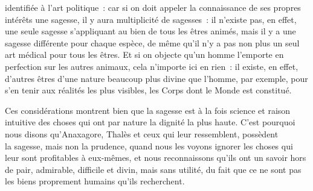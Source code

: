 \documentclass[french,twoside]{book} %
\begin{document}
identifiée à l’art politique : car si on doit appeler la connaissance de ses propres intérêts une sagesse, il y aura multiplicité de sagesses : il n’existe pas, en effet, une seule sagesse s’appliquant au bien de tous les êtres animés, mais il y a une sagesse différente pour chaque espèce, de même qu’il n’y a pas non plus un seul art médical pour tous les êtres. Et si on objecte qu’un homme l’emporte en perfection sur les autres animaux, cela n’importe ici en rien : il existe, en effet, d’autres êtres  d’une nature beaucoup plus divine que l’homme, par exemple, pour s’en tenir aux réalités les plus visibles, les Corps dont le Monde est constitué.\par
Ces considérations montrent bien que la sagesse est à la fois science et raison intuitive des choses qui ont par nature la dignité la plus haute. C’est pourquoi nous disons qu’Anaxagore, Thalès et ceux qui leur ressemblent, possèdent \\
la sagesse, mais non la prudence, quand nous les voyons ignorer les choses qui leur sont profitables à eux-mêmes, et nous reconnaissons qu’ils ont un savoir hors de pair, admirable, difficile et divin, mais sans utilité, du fait que ce ne sont pas les biens proprement humains qu’ils recherchent.
\end{document}
